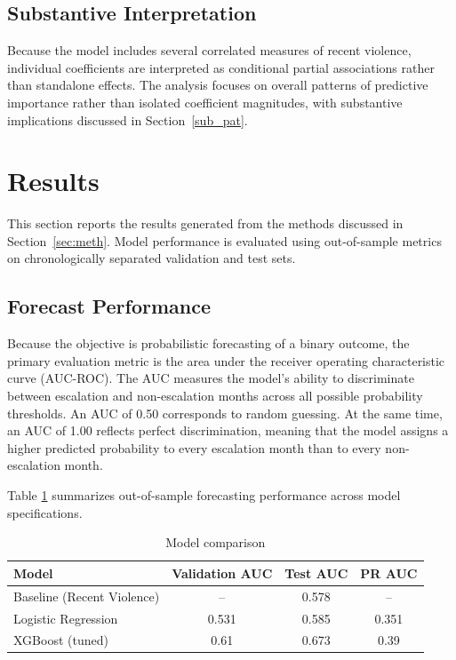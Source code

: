 \documentclass[12pt]{article}
\begin{document}
\subsection{Substantive Interpretation}

Because the model includes several correlated measures of recent violence, individual coefficients are interpreted as conditional partial associations rather than standalone effects. The analysis focuses on overall patterns of predictive importance rather than isolated coefficient magnitudes, with substantive implications discussed in Section~\ref{sub_pat}.


\section{Results}
\label{sec:resu}

This section reports the results generated from the methods discussed in Section~\ref{sec:meth}. Model performance is evaluated using out-of-sample metrics on chronologically separated validation and test sets.

\subsection{Forecast Performance}
\label{sec:forecast_perf}

Because the objective is probabilistic forecasting of a binary outcome, the primary evaluation metric is the area under the receiver operating characteristic curve (AUC-ROC). The AUC measures the model’s ability to discriminate between escalation and non-escalation months across all possible probability thresholds. An AUC of 0.50 corresponds to random guessing. At the same time, an AUC of 1.00 reflects perfect discrimination, meaning that the model assigns a higher predicted probability to every escalation month than to every non-escalation month.

Table \ref{tab:model_comp} summarizes out-of-sample forecasting performance across model specifications.

\begin{table}[H]
\centering
\caption{Model comparison}
\label{tab:model_comp}
\begin{tabular}{lccc}
\toprule
Model & Validation AUC & Test AUC & PR AUC \\
\midrule
Baseline (Recent Violence) & -- & 0.578 & -- \\
Logistic Regression & 0.531 & 0.585 & 0.351 \\
XGBoost (tuned) & 0.61 & 0.673 & 0.39 \\
\bottomrule
\end{tabular}
\end{table}
\end{document}
